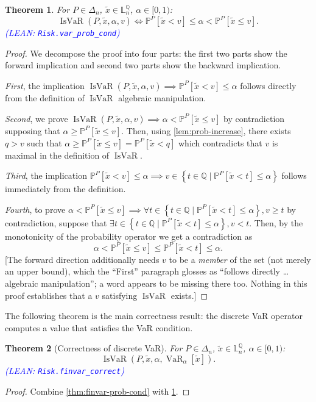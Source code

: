 \documentclass[letterpaper]{article}
\theoremstyle{plain}
\newtheorem{theorem}{Theorem}[subsection]
\theoremstyle{definition}
\theoremstyle{remark}
\newcommand{\PP}{\mathbb{P}}
\DeclareMathOperator{\finvar}{VaR}
\DeclareMathOperator{\isvar}{IsVaR}
\newcommand{\cc}[1]{\textcolor{ccolor}{[#1]}}
\newcommand{\lean}[1]{\textcolor{blue}{(\emph{LEAN}: \texttt{#1})}}
\newcommand{\leanok}{}
\begin{document}
\begin{theorem} \label{thm:var-prob-cond}
 For $P\in \Delta_n$, $\tilde{x}\in \mathbb{L}_n^{\mathbb{Q}}$, $\alpha\in [0,1)$:
  \[
    \isvar(P,\tilde{x},\alpha, v)
    \Longleftrightarrow
    \PP^P[\tilde{x} < v] \le \alpha < \PP^P[\tilde{x} \le v].
  \]
  \lean{Risk.var\_prob\_cond} \leanok
\end{theorem}
\begin{proof}
  We decompose the proof into four parts: the first two parts show the forward implication and second two parts show the backward implication.

  \emph{First}, the implication $\isvar(P,\tilde{x},\alpha, v) \implies \PP^P[\tilde{x} < v] \le \alpha$ follows directly from the definition of $\isvar$ algebraic manipulation.

  \emph{Second}, we prove $\isvar(P,\tilde{x},\alpha, v) \implies \alpha < \PP^P[\tilde{x} \le v]$ by contradiction supposing that $\alpha \ge \PP^P[\tilde{x} \le v]$. Then, using \cref{lem:prob-increase}, there exists $q > v$ such that $\alpha \ge \PP^P[\tilde{x} \le v] =  \PP^P[\tilde{x} < q]$ which contradicts that $v$ is maximal in the definition of $\isvar$.

  \emph{Third}, the implication $\PP^P[\tilde{x} < v] \le \alpha \implies v \in \left\{ t \in \mathbb{Q} \mid  \PP^P[\tilde{x} < t] \le \alpha \right\}$ follows immediately from the definition.

  \emph{Fourth}, to prove  $\alpha < \PP^P[\tilde{x} \le v] \implies \forall t \in \left\{ t \in \mathbb{Q} \mid  \PP^P[\tilde{x} < t] \le \alpha \right\}, v \ge t$ by contradiction, suppose that $\exists t \in \left\{ t \in \mathbb{Q} \mid  \PP^P[\tilde{x} < t] \le \alpha \right\}, v < t$. Then, by the monotonicity of the probability operator we get a contradiction as
 \[
   \alpha
   < \PP^P \left[ \tilde{x} \le v \right]
   \le \PP^P \left[ \tilde{x} < t \right]
   \le \alpha.
 \]
\cc{The forward direction additionally needs $v$ to be a \emph{member} of the set (not merely an upper bound), which the ``First'' paragraph glosses as ``follows directly \ldots{} algebraic manipulation''; a word appears to be missing there too. Nothing in this proof establishes that a $v$ satisfying $\isvar$ exists.}
\end{proof}

The following theorem is the main correctness result: the discrete VaR operator computes a value that satisfies the VaR condition.
\begin{theorem}[Correctness of discrete VaR] \label{thm:finvar-correct}
For $P\in \Delta_n$, $\tilde{x}\in \mathbb{L}_n^{\mathbb{Q}}$, $\alpha\in [0,1)$:
  \[
    \isvar\left(P, \tilde{x}, \alpha, \finvar_{\alpha}[\tilde{x}]\right).
  \]
  \lean{Risk.finvar\_correct} \leanok
\end{theorem}
\begin{proof}
Combine \cref{thm:finvar-prob-cond} with \cref{thm:var-prob-cond}.
\end{proof}
\end{document}
